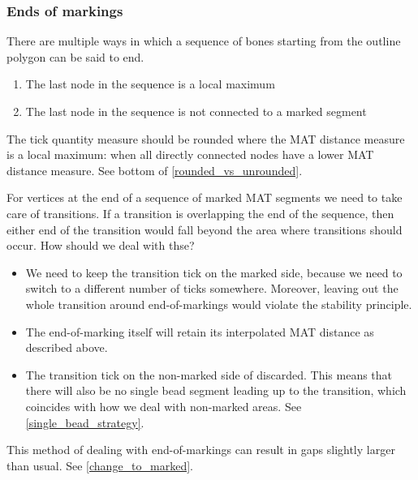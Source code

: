 \subsubsection{Ends of markings}
There are multiple ways in which a sequence of bones starting from the outline polygon can be said to end.
\begin{enumerate}
\item The last node in the sequence is a local maximum
\item The last node in the sequence is not connected to a marked segment
\end{enumerate}

The tick quantity measure should be rounded
where the MAT distance measure is a local maximum: when all directly connected nodes have a lower MAT distance measure.
See bottom of \cref{rounded_vs_unrounded}.



For vertices at the end of a sequence of marked MAT segments we need to take care of transitions.
If a transition is overlapping the end of the sequence, then either end of the transition would fall beyond the area where transitions should occur.
How should we deal with thse?
\begin{itemize}
\item We need to keep the transition tick on the marked side, because we need to switch to a different number of ticks somewhere.
Moreover, leaving out the whole transition around end-of-markings would violate the stability principle.
\item The end-of-marking itself will retain its interpolated MAT distance as described above.
\item The transition tick on the non-marked side of discarded.
This means that there will also be no single bead segment leading up to the transition, which coincides with how we deal with non-marked areas.
See \cref{single_bead_strategy}.
\end{itemize}
This method of dealing with end-of-markings can result in gaps slightly larger than usual.
See \cref{change_to_marked}.

